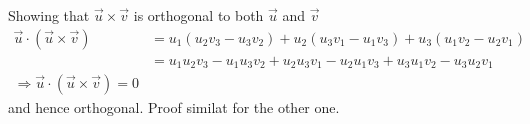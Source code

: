 \begin{note}
	Showing that $\vec{u} \times \vec{v}$ is orthogonal to both $\vec{u}$ and $\vec{v}$
	\begin{align*}
		\vec{u} \cdot (\vec{u} \times \vec{v}) & = u_1(u_2v_3 - u_3v_2) + u_2(u_3v_1 - u_1v_3) + u_3(u_1v_2 - u_2v_1)    \\
		                                       & = u_1u_2v_3 - u_1u_3v_2 + u_2u_3v_1 - u_2u_1v_3 + u_3u_1v_2 - u_3u_2v_1 \\
		\Rightarrow \vec{u} \cdot (\vec{u} \times \vec{v}) = 0
	\end{align*}
	and hence orthogonal. Proof similat for the other one.
\end{note}
